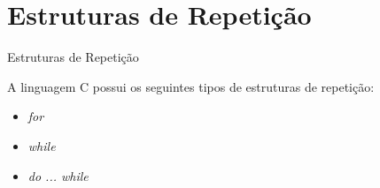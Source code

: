 
\section{Estruturas de Repetição}

\begin{slide}{Estruturas de Repetição}

    \item A linguagem C possui os seguintes tipos de estruturas de repetição:

    \begin{itemize}
        \setlength\itemsep{0.5em}
        \item \textit{for}
        \item \textit{while}
        \item \textit{do ... while}
    \end{itemize}

\end{slide}
    

